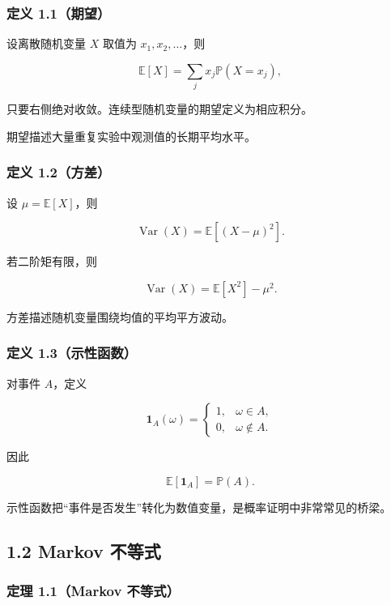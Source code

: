 \documentclass[
  11pt,
  a4paper,
]{ctexart}
\begin{document}
\subsubsection{定义 1.1（期望）}\label{ux5b9aux4e49-1.1ux671fux671b}

设离散随机变量 \(X\) 取值为 \(x_1,x_2,\ldots\)，则

\[
\mathbb E[X]=\sum_jx_j\mathbb P(X=x_j),
\]

只要右侧绝对收敛。连续型随机变量的期望定义为相应积分。

期望描述大量重复实验中观测值的长期平均水平。

\subsubsection{定义 1.2（方差）}\label{ux5b9aux4e49-1.2ux65b9ux5dee}

设 \(\mu=\mathbb E[X]\)，则

\[
\operatorname{Var}(X)=\mathbb E[(X-\mu)^2].
\]

若二阶矩有限，则

\[
\operatorname{Var}(X)=\mathbb E[X^2]-\mu^2.
\]

方差描述随机变量围绕均值的平均平方波动。

\subsubsection{定义
1.3（示性函数）}\label{ux5b9aux4e49-1.3ux793aux6027ux51fdux6570}

对事件 \(A\)，定义

\[
\mathbf 1_A(\omega)=
\begin{cases}
1,&\omega\in A,\\
0,&\omega\notin A.
\end{cases}
\]

因此

\[
\mathbb E[\mathbf1_A]=\mathbb P(A).
\]

示性函数把``事件是否发生''转化为数值变量，是概率证明中非常常见的桥梁。

\subsection{1.2 Markov 不等式}\label{markov-ux4e0dux7b49ux5f0f}

\subsubsection{定理 1.1（Markov
不等式）}\label{ux5b9aux7406-1.1markov-ux4e0dux7b49ux5f0f}
\end{document}
